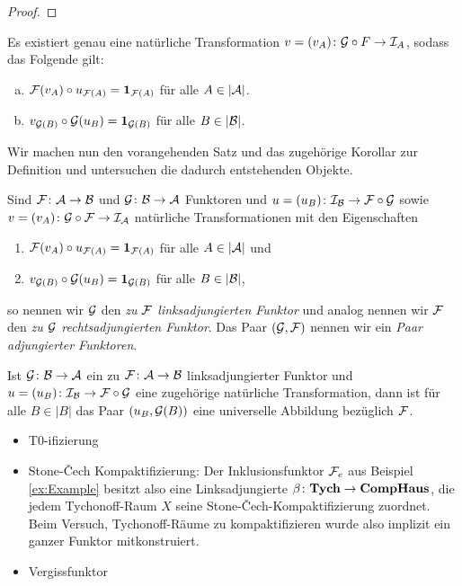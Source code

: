 \begin{proof}
\end{proof}

\begin{kor}
  Es existiert genau eine natürliche Transformation $v = (v_A) \colon \mathcal{G} \circ F \to \mathcal{I}_A$, sodass das Folgende gilt:
  \begin{enumerate}[(a)]
    \item $\mathcal{F}(v_A) \circ u_{\mathcal{F}(A)} = \mathbf{1}_{\mathcal{F}(A)}$ für alle $A \in |\mathcal{A}|$.
    \item $v_{\mathcal{G}(B)} \circ \mathcal{G}(u_B) = \mathbf{1}_{\mathcal{G}(B)}$ für alle $B \in |\mathcal{B}|$.
  \end{enumerate}
\end{kor}

Wir machen nun den vorangehenden Satz und das zugehörige Korollar zur Definition und untersuchen die dadurch entstehenden Objekte.

\begin{defn}
  Sind $\mathcal{F} \colon \mathcal{A} \to \mathcal{B}$ und $\mathcal{G} \colon \mathcal{B} \to \mathcal{A}$ Funktoren und $u = (u_B) \colon \mathcal{I}_{\mathcal{B}} \to \mathcal{F} \circ \mathcal{G}$ sowie $v = (v_A) \colon \mathcal{G} \circ \mathcal{F} \to \mathcal{I}_{\mathcal{A}}$ natürliche Transformationen mit den Eigenschaften
  \begin{enumerate}[(1)]
    \item $\mathcal{F}(v_A) \circ u_{\mathcal{F}(A)} = \mathbf{1}_{\mathcal{F}(A)}$ für alle $A \in |\mathcal{A}|$ und
    \item $v_{\mathcal{G}(B)} \circ \mathcal{G}(u_B) = \mathbf{1}_{\mathcal{G}(B)}$ für alle $B \in |\mathcal{B}|$,
  \end{enumerate}
  so nennen wir $\mathcal{G}$ den \emph{zu $\mathcal{F}$ linksadjungierten Funktor} und analog nennen wir $\mathcal{F}$ den \emph{zu $\mathcal{G}$ rechtsadjungierten Funktor}.
  Das Paar $(\mathcal{G}, \mathcal{F})$ nennen wir ein \emph{Paar adjungierter Funktoren}.
\end{defn}

\begin{thm}
  Ist $\mathcal{G} \colon \mathcal{B} \to \mathcal{A}$ ein zu $\mathcal{F} \colon \mathcal{A} \to \mathcal{B}$ linksadjungierter Funktor und $u = (u_B) \colon \mathcal{I}_{\mathcal{B}} \to \mathcal{F} \circ \mathcal{G}$ eine zugehörige natürliche Transformation, dann ist für alle $B \in |B|$ das Paar $(u_B, \mathcal{G}(B))$ eine universelle Abbildung bezüglich $\mathcal{F}$.
\end{thm}

\begin{bem}
    
\end{bem}

\begin{ex}
  \begin{itemize}
    \item T0-ifizierung
    \item Stone-\v{C}ech Kompaktifizierung: Der Inklusionsfunktor $\mathcal{F}_e$ aus Beispiel \ref{ex:Example} besitzt also eine Linksadjungierte $\beta \colon \mathbf{Tych} \to \mathbf{CompHaus}$, die jedem Tychonoff-Raum $X$ seine Stone-\v{C}ech-Kompaktifizierung zuordnet. Beim Versuch, Tychonoff-Räume zu kompaktifizieren wurde also implizit ein ganzer Funktor mitkonstruiert.
    \item Vergissfunktor
  \end{itemize}
\end{ex}


